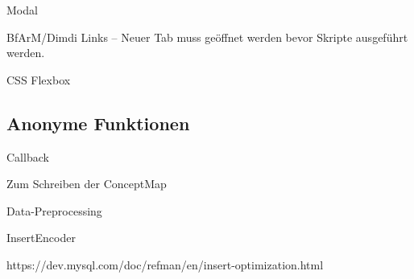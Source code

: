 Modal

BfArM/Dimdi Links -- Neuer Tab muss geöffnet werden bevor Skripte ausgeführt werden. 

CSS Flexbox \cite{flexbox-csstricks}

\subsection{Anonyme Funktionen}

Callback

Zum Schreiben der ConceptMap

Data-Preprocessing

InsertEncoder

https://dev.mysql.com/doc/refman/en/insert-optimization.html
